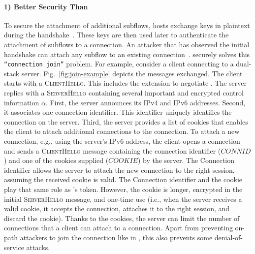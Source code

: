 \paragraph*{1) Better Security Than \mptcp}
To secure the attachment of additional subflows, \mptcp hosts exchange keys in plaintext
during the handshake~\cite{rfc6824, rfc8684}. These keys are then used later to
authenticate the attachment of subflows to a connection. An attacker that has
observed the initial handshake can attach any subflow to an existing \mptcp
connection~\cite{rfc6181}. \tcpls securely solves this \texttt{``connection join''} problem. For example,
consider a client connecting to a dual-stack server. Fig.~\ref{fig:join-example}
depicts the \tls messages exchanged.  The client starts with a
\textsc{ClientHello}. This includes the \tcpls extension to negotiate \tcpls.
The server replies with a \textsc{ServerHello} containing several important and
encrypted control information $\alpha$. First, the server announces its IPv4 and
IPv6 addresses. Second, it associates one connection identifier.  This
identifier uniquely identifies the connection on the server. Third, the server
provides a list of cookies that enables the client to attach additional \tcp
connections to the \tcpls connection. To attach a new connection, e.g., using
the server's IPv6 address, the client opens a \tcp connection and sends a
\textsc{ClientHello} message containing the connection identifier ($CONNID$) and
one of the cookies supplied ($COOKIE$) by the server.
The Connection identifier allows the server to attach the new \tcp connection to
the right \tcpls session, assuming the received cookie is valid. The Connection
identifier and the cookie play that same role as \mptcp's token. However, the
cookie is longer, encrypted in the initial \textsc{ServerHello} message, and
one-time use (i.e., when the server receives a valid cookie, it accepts the
connection, attaches it to the right \tcpls session, and discard the cookie).
Thanks to the cookies, the server can limit the number of \tcp connections that
a client can attach to a \tcpls connection. Apart from preventing on-path
attackers to join the connection like in \mptcp, this also prevents some
denial-of-service attacks. 

